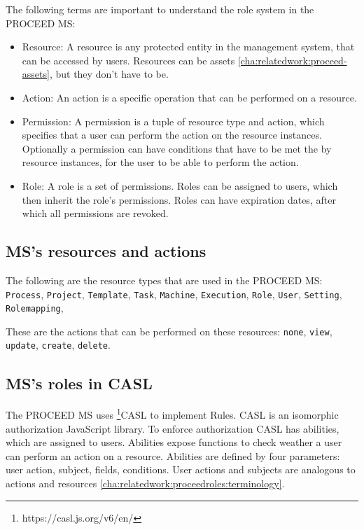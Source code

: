 The following terms are important to understand the role system in the PROCEED MS:

\begin{itemize}
  \item Resource: A resource is any protected entity in the management system, that can be
    accessed by users. Resources can be assets \ref{cha:relatedwork:proceed-assets}, but
    they don't have to be.
  \item Action: An action is a specific operation that can be performed on a resource.
  \item Permission: A permission is a tuple of resource type and action, which specifies that a
    user can perform the action on the resource instances. Optionally a permission can have
    conditions that have to be met the by resource instances, for the user to be able to perform the action.
  \item Role: A role is a set of permissions. Roles can be assigned to users, which then
    inherit the role's permissions. Roles can have expiration dates, after which all
    permissions are revoked.
\end{itemize}

\subsection{MS's resources and actions}
\label{cha:relatedwork:proceedroles:ms-resources-actions}

The following are the resource types that are used in the PROCEED MS:
  \lstinline{Process}, 
  \lstinline{Project},
  \lstinline{Template},
  \lstinline{Task},
  \lstinline{Machine},
  \lstinline{Execution},
  \lstinline{Role},
  \lstinline{User},
  \lstinline{Setting},
  \lstinline{Rolemapping},

These are the actions that can be performed on these resources:
  \lstinline{none},
  \lstinline{view},
  \lstinline{update},
  \lstinline{create},
  \lstinline{delete}.

\subsection{MS's roles in CASL}
\label{cha:relatedwork:proceedroles:casl}

The PROCEED MS uses \footnote{https://casl.js.org/v6/en/}{CASL} to implement Rules. CASL
is an isomorphic authorization JavaScript library.
To enforce authorization CASL has abilities, which are assigned to users.
Abilities expose functions to check weather a user can perform an action on a resource.
Abilities are defined by four parameters: user action, subject, fields, conditions.
User actions and subjects are analogous to actions and resources \ref{cha:relatedwork:proceedroles:terminology}.

